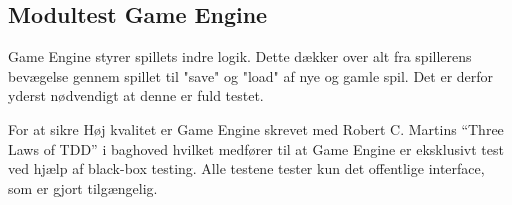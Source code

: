 \subsection{Modultest Game Engine}
Game Engine styrer spillets indre logik. Dette dækker over alt fra spillerens bevægelse gennem spillet til "save" og "load" af nye og gamle spil.
Det er derfor yderst nødvendigt at denne er fuld testet.

For at sikre Høj kvalitet er Game Engine skrevet med Robert C. Martins
``Three Laws of TDD'' \parencite{CleanCode} i baghoved hvilket medfører til at Game Engine er 
eksklusivt test ved hjælp af black-box testing. Alle testene tester
kun det offentlige interface, som er gjort tilgængelig. 
\newpage 



\newpage

